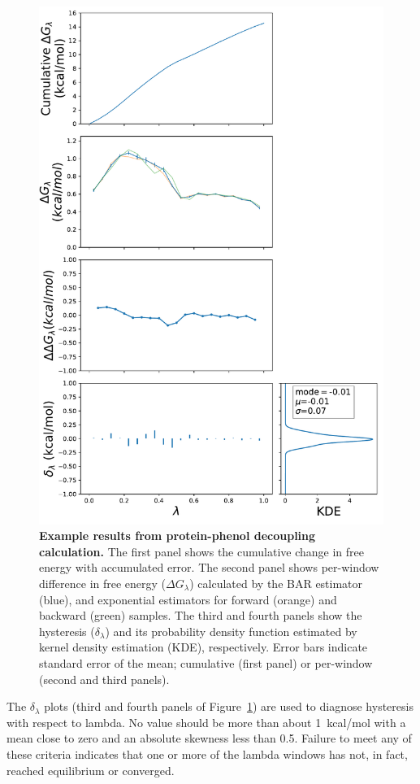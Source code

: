 \documentclass[9pt,tutorial]{Styling/livecoms}
\begin{document}
\begin{figure}[!ht]
    \centering
    \includegraphics[width=0.9\linewidth]{bound_generalFigures}
    \caption{\textbf{Example results from protein-phenol decoupling calculation.} The first panel shows the cumulative change in free energy with accumulated error. The second panel shows per-window difference in free energy ($\Delta G_\lambda$) calculated by the BAR estimator (blue), and exponential estimators for forward (orange) and backward (green) samples. The third and fourth panels show the hysteresis ($\delta_\lambda$) and its probability density function estimated by kernel density estimation (KDE), respectively. Error bars indicate standard error of the mean; cumulative (first panel) or per-window (second and third panels).
    }\label{fig:FEPexample}
\end{figure}

The $\delta_\lambda$ plots (third and fourth panels of Figure~\ref{fig:FEPexample}) are used to diagnose hysteresis with respect to lambda. No value should be more than about 1~kcal/mol with a mean close to zero and an absolute skewness less than 0.5. Failure to meet any of these criteria indicates that one or more of the lambda windows has not, in fact, reached equilibrium or converged.
\end{document}
